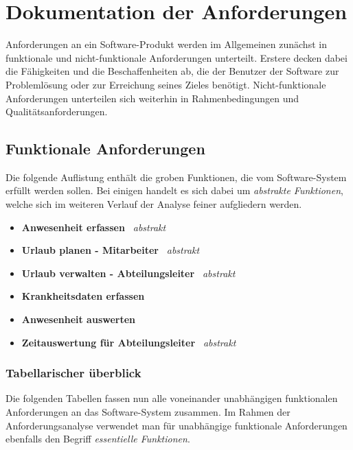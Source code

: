 \chapter{Dokumentation der Anforderungen}
Anforderungen an ein Software-Produkt werden im Allgemeinen zunächst in funktionale und nicht-funktionale Anforderungen unterteilt. Erstere decken dabei die Fähigkeiten und die Beschaffenheiten ab, die der Benutzer der Software zur Problemlösung oder zur Erreichung seines Zieles benötigt. Nicht-funktionale Anforderungen unterteilen sich weiterhin in Rahmenbedingungen und Qualitätsanforderungen.

\section{Funktionale Anforderungen}
Die folgende Auflistung enthält die groben Funktionen, die vom Software-System erfüllt werden sollen. Bei einigen handelt es sich dabei um \textit{abstrakte Funktionen}, welche sich im weiteren Verlauf der Analyse feiner aufgliedern werden.

\begin{itemize}
	\item \textbf{Anwesenheit erfassen} \textit{\guillemotleft \ abstrakt \ \guillemotright}
	\item \textbf{Urlaub planen - Mitarbeiter} \textit{\guillemotleft \ abstrakt \ \guillemotright}
	\item \textbf{Urlaub verwalten - Abteilungsleiter} \textit{\guillemotleft \ abstrakt \ \guillemotright}
	\item \textbf{Krankheitsdaten erfassen}
	\item \textbf{Anwesenheit auswerten}
	\item \textbf{Zeitauswertung für Abteilungsleiter} \textit{\guillemotleft \ abstrakt \ \guillemotright}
\end{itemize}

\subsection{Tabellarischer überblick}
Die folgenden Tabellen fassen nun alle voneinander unabhängigen funktionalen Anforderungen an das Software-System zusammen. Im Rahmen der Anforderungsanalyse verwendet man für unabhängige funktionale Anforderungen ebenfalls den Begriff \textit{essentielle Funktionen}.

